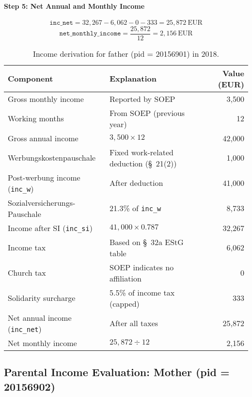 \paragraph{Step 5: Net Annual and Monthly Income}

\[
\texttt{inc\_net} = 32{,}267 - 6{,}062 - 0 - 333 = 25{,}872~\text{EUR}
\]
\[
\texttt{net\_monthly\_income} = \frac{25{,}872}{12} = 2{,}156~\text{EUR}
\]

\begin{table}[H]
\scriptsize
\centering
\begin{tabular}{llr}
\toprule
\textbf{Component} & \textbf{Explanation} & \textbf{Value (EUR)} \\
\midrule
Gross monthly income & Reported by SOEP & 3,500 \\
Working months & From SOEP (previous year) & 12 \\
Gross annual income & $3{,}500 \times 12$ & 42,000 \\
Werbungskostenpauschale & Fixed work-related deduction (§~21(2)) & 1,000 \\
Post-werbung income (\texttt{inc\_w}) & After deduction & 41,000 \\
Sozialversicherungs-Pauschale & 21.3\% of \texttt{inc\_w} & 8,733 \\
Income after SI (\texttt{inc\_si}) & $41{,}000 \times 0.787$ & 32,267 \\
Income tax & Based on §~32a EStG table & 6,062 \\
Church tax & SOEP indicates no affiliation & 0 \\
Solidarity surcharge & 5.5\% of income tax (capped) & 333 \\
Net annual income (\texttt{inc\_net}) & After all taxes & 25,872 \\
Net monthly income & $25{,}872 \div 12$ & 2,156 \\
\bottomrule
\end{tabular}
\caption{Income derivation for father (pid = 20156901) in 2018.}
\label{table:bafoeg_parent_father}
\end{table}


\subsection{Parental Income Evaluation: Mother (pid = 20156902)}

